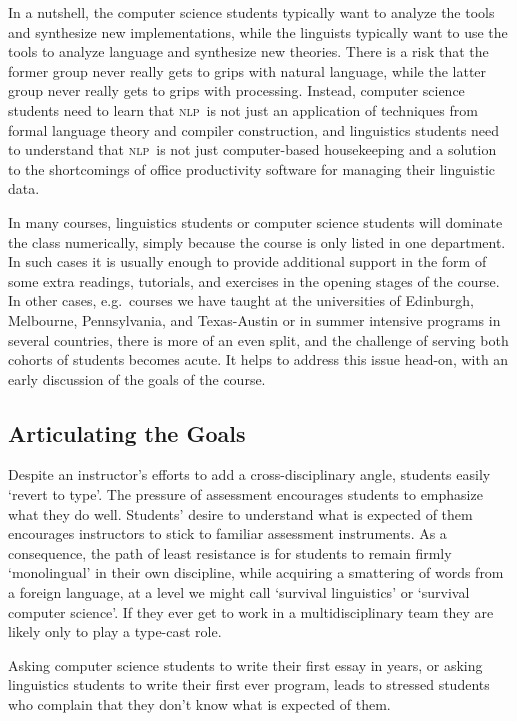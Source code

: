 \documentclass[11pt]{article}
\newcommand{\NLP}{\textsc{nlp}}
\begin{document}
In a nutshell, the computer science students typically want to analyze
the tools and synthesize new implementations, while the linguists
typically want to use the tools to analyze language and
synthesize new theories.  There is a risk that the former group
never really gets to grips with natural language, while the latter
group never really gets to grips with processing.  Instead,
computer science students need to learn that \NLP\ is not just an
application of techniques from formal language theory and compiler
construction, and linguistics students need to understand that \NLP\ is not
just computer-based housekeeping and a solution to the shortcomings of
office productivity software for managing their linguistic data.

In many courses, linguistics students or computer science students
will dominate the class numerically, simply because the course is only
listed in one department.  In such cases it is usually enough to
provide additional support in the form of some extra readings,
tutorials, and exercises in the opening stages of the course.  In
other cases, e.g.\ courses we have taught at the universities of
Edinburgh, Melbourne, Pennsylvania, and Texas-Austin or in summer
intensive programs in several countries, there is more of an even
split, and the challenge of serving both cohorts of students becomes
acute.  It helps to address this issue head-on, with an early
discussion of the goals of the course.

\subsection{Articulating the Goals}

Despite an instructor's efforts to add a cross-disciplinary angle, students
easily `revert to type'.  The pressure of assessment encourages students to emphasize
what they do well.  Students' desire to understand what is expected of them encourages
instructors to stick to familiar assessment instruments.  As a consequence,
the path of least resistance is for students to remain firmly
`monolingual' in their own discipline, while
acquiring a smattering of words from a foreign language, at a level we might
call `survival linguistics' or `survival computer science'.
If they ever get to work in a multidisciplinary team they are likely
only to play a type-cast role.

Asking computer science students to write their first essay in years,
or asking linguistics students to write their first ever program,
leads to stressed students who complain that they don't know what is
expected of them.
\end{document}
